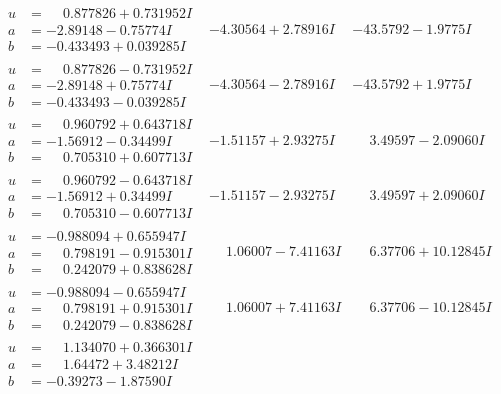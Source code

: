 \documentclass[1p]{elsarticle_modified}
\theoremstyle{definition}
\begin{document}
$$\begin{array}{c|c|c}
\begin{aligned}
u &= \phantom{-}0.877826 + 0.731952 I \\
a &= -2.89148 - 0.75774 I \\
b &= -0.433493 + 0.039285 I\end{aligned}
 & -4.30564 + 2.78916 I & -43.5792 - 1.9775 I \\ \hline\begin{aligned}
u &= \phantom{-}0.877826 - 0.731952 I \\
a &= -2.89148 + 0.75774 I \\
b &= -0.433493 - 0.039285 I\end{aligned}
 & -4.30564 - 2.78916 I & -43.5792 + 1.9775 I \\ \hline\begin{aligned}
u &= \phantom{-}0.960792 + 0.643718 I \\
a &= -1.56912 - 0.34499 I \\
b &= \phantom{-}0.705310 + 0.607713 I\end{aligned}
 & -1.51157 + 2.93275 I & \phantom{-}3.49597 - 2.09060 I \\ \hline\begin{aligned}
u &= \phantom{-}0.960792 - 0.643718 I \\
a &= -1.56912 + 0.34499 I \\
b &= \phantom{-}0.705310 - 0.607713 I\end{aligned}
 & -1.51157 - 2.93275 I & \phantom{-}3.49597 + 2.09060 I \\ \hline\begin{aligned}
u &= -0.988094 + 0.655947 I \\
a &= \phantom{-}0.798191 - 0.915301 I \\
b &= \phantom{-}0.242079 + 0.838628 I\end{aligned}
 & \phantom{-}1.06007 - 7.41163 I & \phantom{-}6.37706 + 10.12845 I \\ \hline\begin{aligned}
u &= -0.988094 - 0.655947 I \\
a &= \phantom{-}0.798191 + 0.915301 I \\
b &= \phantom{-}0.242079 - 0.838628 I\end{aligned}
 & \phantom{-}1.06007 + 7.41163 I & \phantom{-}6.37706 - 10.12845 I \\ \hline\begin{aligned}
u &= \phantom{-}1.134070 + 0.366301 I \\
a &= \phantom{-}1.64472 + 3.48212 I \\
b &= -0.39273 - 1.87590 I\end{aligned}

\end{array}$$
\end{document}
